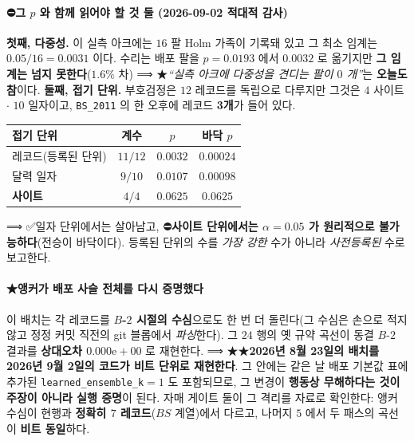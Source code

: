\documentclass[11pt]{report}
\numberwithin{equation}{chapter}
\numberwithin{figure}{chapter}
\numberwithin{table}{chapter}
\begin{document}
\paragraph{⛔그 $p$ 와 함께 읽어야 할 것 둘 (2026-09-02 적대적 감사)}
\textbf{첫째, 다중성.} 이 실측 아크에는 $16$ 팔 Holm 가족이 기록돼 있고 그 최소 임계는
$0.05/16 = 0.0031$ 이다. 수리는 배포 팔을 $p = 0.0193$ 에서 $0.0032$ 로 옮기지만
\textbf{그 임계는 넘지 못한다}($1.6\%$ 차) ⟹ ★\emph{``실측 아크에 다중성을 견디는 팔이
$0$ 개''}는 \textbf{오늘도 참}이다.
\textbf{둘째, 접기 단위.} 부호검정은 $12$ 레코드를 독립으로 다루지만 그것은 $4$ 사이트
$\cdot$ $10$ 일자이고, \texttt{BS\_2011} 의 한 오후에 레코드 \textbf{3개}가 들어 있다.

\begin{center}
\begin{tabular}{lccc}
\hline
접기 단위 & 계수 & $p$ & 바닥 $p$ \\
\hline
레코드(등록된 단위) & $11/12$ & $0.0032$ & $0.00024$ \\
달력 일자 & $9/10$ & $0.0107$ & $0.00098$ \\
\textbf{사이트} & $4/4$ & $\mathbf{0.0625}$ & $\mathbf{0.0625}$ \\
\hline
\end{tabular}
\end{center}

⟹ ✅일자 단위에서는 살아남고, ⛔\textbf{사이트 단위에서는 $\alpha = 0.05$ 가 원리적으로
불가능하다}(전승이 바닥이다). 등록된 단위의 수를 \emph{가장 강한} 수가 아니라
\emph{사전등록된} 수로 보고한다.

\paragraph{★앵커가 배포 사슬 전체를 다시 증명했다}
이 배치는 각 레코드를 \textbf{$B$-$2$ 시절의 수심}으로도 한 번 더 돌린다(그 수심은 손으로
적지 않고 정정 커밋 직전의 git 블롭에서 \emph{파싱}한다). 그 $24$ 행의 옛 규약 곡선이
동결 $B$-$2$ 결과를 \textbf{상대오차 $0.000\mathrm{e}{+}00$} 로 재현한다.
⟹ ★★\textbf{2026년 8월 23일의 배치를 2026년 9월 2일의 코드가 비트 단위로 재현한다}.
그 안에는 같은 날 배포 기본값 표에 추가된 \texttt{learned\_ensemble\_k}$=1$ 도 포함되므로,
그 변경이 \textbf{행동상 무해하다는 것이 주장이 아니라 실행 증명}이 된다.
자매 게이트 둘이 그 격리를 자료로 확인한다: 앵커 수심이 현행과 \textbf{정확히 $7$
레코드}($BS$ 계열)에서 다르고, 나머지 $5$ 에서 두 패스의 곡선이 \textbf{비트 동일}하다.
\end{document}
